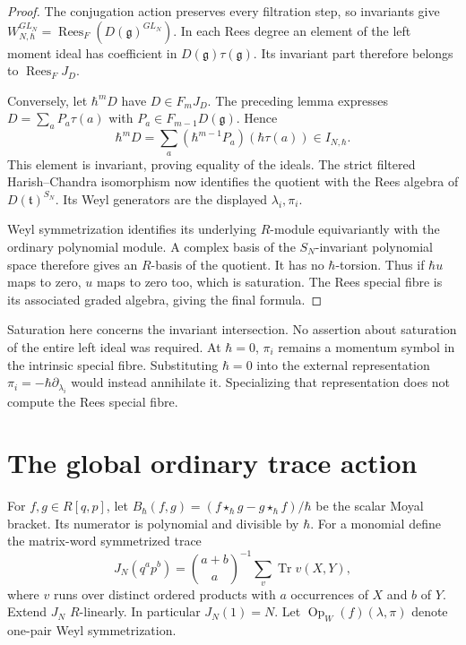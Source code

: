 \begin{proof}
The conjugation action preserves every filtration step, so
invariants give
$W_{N,\hbar}^{GL_N}
 =\operatorname{Rees}_F(D(\mathfrak g)^{GL_N})$.
In each Rees degree an element of the left moment ideal
has coefficient in $D(\mathfrak g)\tau(\mathfrak g)$.
Its invariant part therefore belongs to
$\operatorname{Rees}_FJ_D$.

Conversely, let $\hbar^mD$ have $D\in F_mJ_D$.
The preceding lemma expresses
$D=\sum_aP_a\tau(a)$ with $P_a\in F_{m-1}D(\mathfrak g)$.
Hence
\[
 \hbar^mD=\sum_a(\hbar^{m-1}P_a)(\hbar\tau(a))
       \in I_{N,\hbar}.
\]
This element is invariant, proving equality of the ideals.
The strict filtered Harish--Chandra isomorphism now
identifies the quotient with the Rees algebra of
$D(\mathfrak t)^{S_N}$.
Its Weyl generators are the displayed $\lambda_i,\pi_i$.

Weyl symmetrization identifies its underlying $R$-module
equivariantly with the ordinary polynomial module.
A complex basis of the $S_N$-invariant polynomial space
therefore gives an $R$-basis of the quotient.
It has no $\hbar$-torsion. Thus if $\hbar u$ maps to zero,
$u$ maps to zero too, which is saturation.
The Rees special fibre is its associated graded algebra,
giving the final formula.
\end{proof}

Saturation here concerns the invariant intersection.
No assertion about saturation of the entire left ideal
was required. At $\hbar=0$, $\pi_i$ remains a momentum
symbol in the intrinsic special fibre. Substituting
$\hbar=0$ into the external representation
$\pi_i=-\hbar\partial_{\lambda_i}$ would instead annihilate
it. Specializing that representation does not compute
the Rees special fibre.

\section{The global ordinary trace action}
\label{sec:vol2-global-ordinary-moyal-action}

For $f,g\in R[q,p]$, let
$B_\hbar(f,g)=(f\star_\hbar g-g\star_\hbar f)/\hbar$
be the scalar Moyal bracket. Its numerator is polynomial
and divisible by $\hbar$.
For a monomial define the matrix-word symmetrized trace
\[
 J_N(q^ap^b)
  =\binom{a+b}{a}^{-1}\sum_{v}\operatorname{Tr}v(X,Y),
\]
where $v$ runs over distinct ordered products with $a$
occurrences of $X$ and $b$ of $Y$.
Extend $J_N$ $R$-linearly. In particular $J_N(1)=N$.
Let $\operatorname{Op}_W(f)(\lambda,\pi)$ denote
one-pair Weyl symmetrization.

